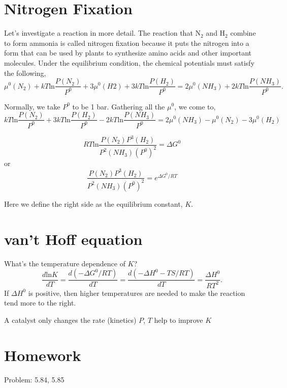 \section{Nitrogen Fixation}
Let's investigate a reaction in more detail. The reaction that N$_2$ and H$_2$ combine to form ammonia is called nitrogen fixation
because it puts the nitrogen into a form that can be used by plants to synthesize amino acids and other important molecules.
Under the equilibrium condition, the chemical potentials must satisfy the following,
\begin{equation}
\mu^0(N_2) + kT\text{ln}\frac{P(N_2)}{P^0} + 3\mu^0(H2) + 3kT\text{ln}\frac{P(H_2)}{P^0}  =  2\mu^0(NH_3) + 2kT\text{ln}\frac{P(NH_3)}{P^0}.
\end{equation}

Normally, we take $P^0$ to be 1 bar. Gathering all the $\mu^0$, we come to,
\begin{equation}
kT\text{ln}\frac{P(N_2)}{P^0} + 3kT\text{ln}\frac{P(H_2)}{P^0} - 2kT\text{ln}\frac{P(NH_3)}{P^0} = 
2\mu^0({NH_3}) - \mu^0(N_2) - 3\mu^0({H_2})
\end{equation}

\begin{equation}
RT\text{ln}\frac{P(N_2)P^3(H_2)}{P^2(NH_3)(P^0)^2} = \Delta{G^0}
\end{equation}
or
\begin{equation}
\frac{P(N_2)P^3(H_2)}{P^2(NH_3)(P^0)^2} = e^{\Delta{G^0}/RT}
\end{equation}

Here we define the right side as the equilibrium constant, $K$.

\section{van't Hoff equation}
What's the temperature dependence of $K$?
\begin{equation}
\frac{d\text{ln}K}{dT} = \frac{d(-\Delta{G^0}/RT)}{dT} =  \frac{d(-\Delta{H^0-TS}/RT)}{dT} = \frac{\Delta{H^0}}{RT^2}.
\end{equation}
If $\Delta{H^0}$ is positive, then higher temperatures are needed to make the reaction tend more to the right.

A catalyst only changes the rate (kinetics) 
$P$, $T$ help to improve $K$

\section{Homework}
Problem: 5.84, 5.85


